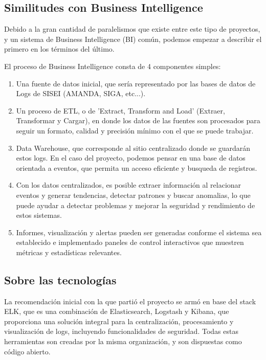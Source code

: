 
\subsection{Similitudes con Business Intelligence}
\label{sec:similitud_bi}

Debido a la gran cantidad de paralelismos que existe entre este tipo de proyectos, y un sistema de Business Intelligence (BI) común, podemos empezar a describir el primero en los términos del último.


El proceso de Business Intelligence consta de 4 componentes simples:

\begin{enumerate}
  \item Una fuente de datos inicial, que sería representado por las bases de datos de Logs de SISEI (AMANDA, SIGA, etc...).
  \item Un proceso de ETL, o de 'Extract, Transform and Load' (Extraer, Transformar y Cargar), en donde los datos de las fuentes son procesados para seguir un formato, calidad y precisión mínimo con el que se puede trabajar.
  \item Data Warehouse, que corresponde al sitio centralizado donde se guardarán estos logs. En el caso del proyecto, podemos pensar en una base de datos orientada a eventos, que permita un acceso eficiente y busqueda de registros.
  \item Con los datos centralizados, es posible extraer información al relacionar eventos y generar tendencias, detectar patrones y buscar anomalias, lo que puede ayudar a detectar problemas y mejorar la seguridad y rendimiento de estos sistemas.
  \item Informes, visualización y alertas pueden ser generadas conforme el sistema sea establecido e implementado paneles de control interactivos que muestren métricas y estadísticas relevantes.
\end{enumerate}

\subsection{Sobre las tecnologías}

La recomendación inicial con la que partió el proyecto se armó en base del stack ELK, que es una combinación de Elasticsearch, Logstash y Kibana, que proporciona una solución integral para la centralización, procesamiento y visualización de logs, incluyendo funcionalidades de seguridad. Todas estas herramientas son creadas por la misma organización, y son dispuestas como código abierto.

